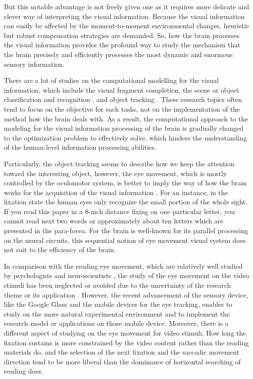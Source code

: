 \documentclass[10pt,letterpaper]{article}
\begin{document}
But this notable advantage is not freely given one as it requires more delicate and clever way of interpreting the visual information. Because the visual information can easily be affected by the moment-to-moment environmental changes, heuristic but robust compensation strategies are demanded. So, how the brain processes the visual information provides the profound way to study the mechanism that the brain precisely and efficiently processes the most dynamic and enormous sensory information.

There are a lot of studies on the computational modelling for the visual information, which include the visual fragment completion, the scene or object classification and recognition \cite{winn2005,lazebnik2006}, and object tracking \cite{YiWu2013}. These research topics often tend to focus on the objective for each tasks, not on the implementation of the method how the brain deals with. As a result, the computational approach to the modeling for the visual information processing of the brain is gradually changed to the optimization problem to effectively solve, which hinders the understanding of the human-level information processing abilities. 

Particularly, the object tracking seems to describe how we keep the attention toward the interesting object, however, the eye movement, which is mostly controlled by the oculomotor system, is better to imply the way of how the brain works for the acquisition of the visual information \cite{Henderson2003}. For an instance, in the fixation state the human eyes only recognize the small portion of the whole sight. If you read this paper in a 8-inch distance fixing on one particular letter, you cannot read next two words or approximately about ten letters which are presented in the para-fovea. For the brain is well-known for its parallel processing on the neural circuits, this sequential notion of eye movement visual system does not suit to the efficiency of the brain.

In comparison with the reading eye movement, which are relatively well studied by psychologists and neuroscientists \cite{Rayner1998,Reichle1998}, the study of the eye movement on the video stimuli has been neglected or avoided due to the uncertainty of the research theme or its application \cite{Tatler2011}. However, the recent advancement of the sensory device, like the Google Glass and the mobile devices for the eye tracking, enables to study on the more natural experimental environment and to implement the research model or applications on those mobile device. Moreover, there is a different aspect of studying on the eye movement for video stimuli. How long the fixation sustains is more constrained by the video content rather than the reading materials do, and the selection of the next fixation and the saccadic movement direction tend to be more liberal than the dominance of horizontal searching of reading does. 
\end{document}
